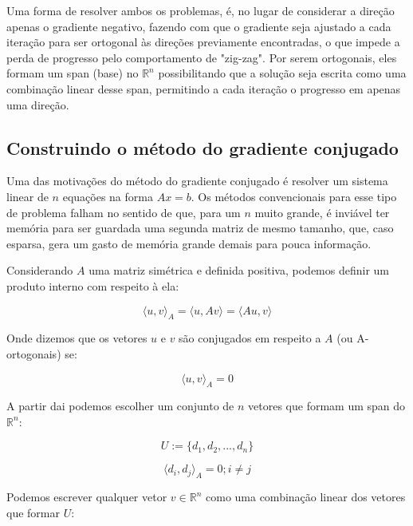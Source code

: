 Uma forma de resolver ambos os problemas, é, no lugar de considerar a direção
apenas o gradiente negativo, fazendo com que o gradiente seja ajustado a cada
iteração para ser ortogonal às direções previamente encontradas, o que impede
a perda de progresso pelo comportamento de "zig-zag". Por serem ortogonais,
eles formam um span (base) no \( \mathbb{R}^n \) possibilitando que a solução
seja escrita como uma combinação linear desse span, permitindo a cada iteração
o progresso em apenas uma direção.

\subsection{Construindo o método do gradiente conjugado}

\noindent
Uma das motivações do método do gradiente conjugado \cite{bonnans2006numerical}
\cite{1987polyak} é resolver um sistema linear de \(n\) equações na forma \(Ax = b \).
Os métodos convencionais para esse tipo de problema falham no sentido de que, para um
\(n\) muito grande, é inviável ter memória para ser guardada uma segunda matriz de
mesmo tamanho, que, caso esparsa, gera um gasto de memória grande demais para pouca
informação.

Considerando \(A\) uma matriz simétrica e definida positiva, podemos definir um produto
interno com respeito à ela:

\begin{equation}
\langle u, v \rangle_A = \langle u, Av \rangle =  \langle Au, v \rangle 
\end{equation}

Onde dizemos que os vetores \(u\) e \(v\) são conjugados em respeito a \(A\) (ou A-ortogonais) se:

\begin{equation}
\label{aortogonal}
\langle u, v \rangle_A = 0
\end{equation}

A partir dai podemos escolher um conjunto de \(n\) vetores que formam um span do
\( \mathbb{R}^n \):

\begin{equation}
U := \{d_1, d_2, ..., d_n\}
\end{equation}

\begin{equation}
\label{gc_prod_interno}
\langle d_i, d_j \rangle_A = 0; i \ne j
\end{equation}

Podemos escrever qualquer vetor \(v \in \mathbb{R}^n\) como uma combinação linear dos
vetores que formar \(U\):

